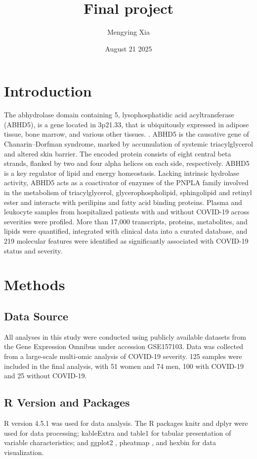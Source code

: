 \documentclass{article}
\title{\textbf{Final project}}
\author{Mengying Xia}
\date{August 21 2025}
\begin{document}
\maketitle


\section{Introduction}

The abhydrolase domain containing 5, lysophosphatidic acid acyltransferase (ABHD5), is a gene located in 3p21.33, \cite{ref1} that is ubiquitously expressed in adipose tissue, bone marrow, and various other tissues. \cite{ref2}. ABHD5 is the causative gene of Chanarin–Dorfman syndrome, marked by accumulation of systemic triacylglycerol and altered skin barrier.\cite{ref3} The encoded protein consists of eight central beta strands, flanked by two and four alpha helices on each side, respectively. ABHD5 is a key regulator of lipid and energy homeostasis. Lacking intrinsic hydrolase activity, ABHD5 acts as a coactivator of enzymes of the PNPLA family involved in the metabolism of triacylglycerol, glycerophospholipid, sphingolipid and retinyl ester and interacts with perilipins and fatty acid binding proteins. \cite{ref4} Plasma and leukocyte samples from hospitalized patients with and without COVID-19 across severities were profiled. More than 17,000 transcripts, proteins, metabolites, and lipids were quantified, integrated with clinical data into a curated database, and 219 molecular features were identified as significantly associated with COVID-19 status and severity. \cite{ref5}

\section{Methods}
\subsection{Data Source}
All analyses in this study were conducted using publicly available datasets from the Gene Expression Omnibus under accession GSE157103. \cite{ref5} Data was collected from a large-scale multi-omic analysis of COVID-19 severity. 125 samples were included in the final analysis, with 51 women and 74 men, 100 with COVID-19 and 25 without COVID-19.

\subsection{R Version and Packages}
R version 4.5.1 was used for data analysis. The R packages knitr \cite{ref6} and dplyr \cite{ref7}  were used for data processing; kableExtra \cite{ref8} and table1 \cite{ref9} for tabular presentation of variable characteristics; and ggplot2 \cite{ref10}, pheatmap \cite{ref11}, and hexbin \cite{ref12} for data visualization.
\end{document}
